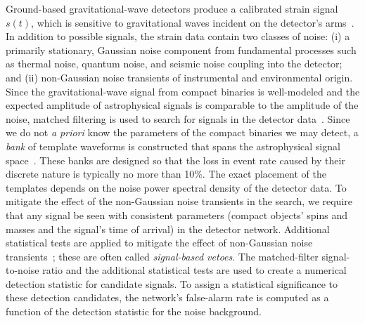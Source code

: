 Ground-based gravitational-wave detectors produce a calibrated strain signal
$s(t)$, which is sensitive to gravitational waves incident on the detector's
arms~\cite{Abadie:2010px}. In addition to possible signals, the strain data contain two classes of
noise: (i) a primarily stationary, Gaussian noise component from fundamental
processes such as thermal noise, quantum noise, and seismic noise coupling
into the detector; and (ii) non-Gaussian noise transients of instrumental and
environmental origin. Since the gravitational-wave signal from compact
binaries is well-modeled and the expected amplitude of astrophysical signals is
comparable to the amplitude of the noise,
matched filtering is used to search for signals in the detector data~\cite{Allen:2005fk}.  Since
we do not \emph{a priori} know the parameters of the compact
binaries we may detect, a \emph{bank} of template waveforms is constructed that spans the astrophysical
signal space~\cite{Sathyaprakash:1991mt,Dhurandhar:1992mw,Owen:1995tm,Owen:1998dk,Babak:2006ty,Cokelaer:2007kx,Brown:2012qf,Keppel:2013yia,Keppel:2013uma}. These banks are designed so that the loss in event rate caused by
their discrete nature is typically no more than 10\%. The exact placement of the
templates depends on the noise power spectral density of the detector data. To
mitigate the effect of the non-Gaussian noise transients in the search, we
require that any signal be seen with consistent parameters (compact objects'
spins and masses and the signal's time of arrival) in the detector network. Additional
statistical tests are applied to mitigate the effect of non-Gaussian
noise transients~\cite{Allen:2004gu}; these are often called \emph{signal-based vetoes}. The 
matched-filter signal-to-noise ratio and the additional statistical tests are used to
create a numerical detection statistic for candidate signals. To assign a
statistical significance to these detection candidates, the network's false-alarm rate is computed as a function of the detection statistic for the
noise background.

